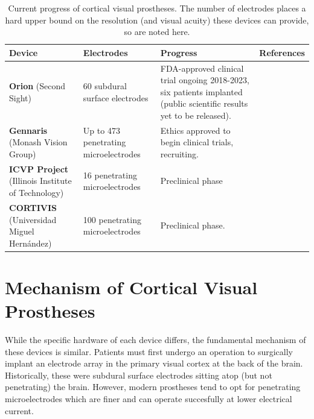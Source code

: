 \documentclass[a4paper,11pt,openany]{book}
\begin{document}
\renewcommand{\arraystretch}{1.5}

\begin{table}[htbp]
\caption[Current progress of cortical visual prostheses]{\label{tab:org21b9156}
Current progress of cortical visual prostheses. The number of electrodes places a hard upper bound on the resolution (and visual acuity) these devices can provide, so are noted here.}
\centering
\scriptsize
\begin{tabu} to \textwidth {XXXl}
Device & Electrodes & Progress & References\\
\hline
\textbf{Orion} \newline (Second Sight) & 60 subdural surface electrodes & FDA-approved clinical trial ongoing 2018-2023, six patients implanted (public scientific results yet to be released). & \cite{secondsight_early_nodate,secondsight_second_nodate,niketeghad_brain_2019}\\
\textbf{Gennaris} \newline (Monash Vision Group) & Up to 473 penetrating microelectrodes & Ethics approved to begin clinical trials, recruiting. & \cite{lowery_monash_2017,lowery_restoration_2015,anzctr_first_2018}\\
\textbf{ICVP Project} \newline (Illinois Institute of Technology) & 16 penetrating microelectrodes & Preclinical phase & \cite{troyk_intracortical_2017}\\
\textbf{CORTIVIS} \newline (Universidad Miguel Hernández) & 100 penetrating microelectrodes & Preclinical phase. & \cite{fernandez_cortivis_2017}\\
\end{tabu}
\end{table}

\section*{Mechanism of Cortical Visual Prostheses}
\label{sec:org5a81f8c}

While the specific hardware of each device differs, the fundamental mechanism of these devices is similar.
Patients must first undergo an operation to surgically implant an electrode array in the primary visual cortex at the back of the brain. \cite{lewis_restoration_2015}
Historically, these were subdural surface electrodes sitting atop (but not penetrating) the brain. \cite{brindley_sensations_1968,dobelle_phosphenes_1974}
However, modern prostheses tend to opt for penetrating microelectrodes \cite{lowery_monash_2017,troyk_intracortical_2017,fernandez_cortivis_2017} which are finer and can operate succesfully at lower electrical current. \cite{bak_visual_1990,schmidt_feasibility_1996}
\end{document}
